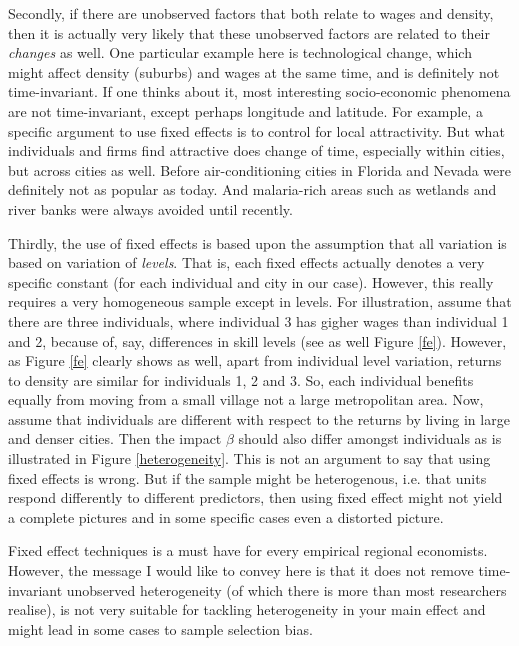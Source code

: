 \documentclass[fleqn,10pt]{SelfArx} %
\begin{document}
Secondly, if there are unobserved factors that both relate to wages and density,
then it is actually very likely that these unobserved factors are related to
their \emph{changes} as well. One particular example here is technological
change, which might affect density (suburbs) and wages at the same time, and is
definitely not time-invariant. If one thinks about it, most interesting
socio-economic phenomena are not time-invariant, except perhaps longitude and
latitude. For example, a specific argument to use fixed effects is to control
for local attractivity. But what individuals and firms find attractive does
change of time, especially within cities, but across cities as well. Before
air-conditioning cities in Florida and Nevada were definitely not as popular as
today. And malaria-rich areas such as wetlands and river banks were always
avoided until recently.   

Thirdly, the use of fixed effects is based upon the assumption that all
variation is based on variation of \emph{levels}. That is, each fixed effects
actually denotes a very specific constant (for each individual and city in our
case). However, this really requires a very homogeneous sample except in levels.
For illustration, assume that there are three individuals, where individual 3
has gigher wages than individual 1 and 2, because of, say, differences in skill
levels (see as well Figure \ref{fe}). However, as Figure \ref{fe} clearly shows
as well, apart from individual level variation, returns to density are similar
for individuals 1, 2 and 3. So, each individual benefits equally from moving
from a small village not a large metropolitan area. Now, assume that individuals
are different with respect to the returns by living in large and denser cities.
Then the impact $\beta$ should also differ amongst individuals as is illustrated
in Figure \ref{heterogeneity}. This is not an argument to say that using fixed
effects is wrong. But if the sample might be heterogenous, i.e. that
units respond differently to different predictors, then using fixed effect might
not yield a complete pictures and in some specific cases even a distorted picture. 

Fixed effect techniques is a must have for every empirical regional economists.
However, the message I would like to convey here is that it does not remove
time-invariant unobserved heterogeneity (of which there is more than most
researchers realise), is not very suitable for tackling heterogeneity in your
main effect and might lead in some cases to sample selection bias.
\end{document}
